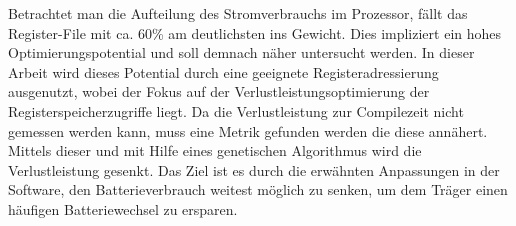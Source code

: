Betrachtet man die Aufteilung des Stromverbrauchs im Prozessor, fällt das Register-File mit ca. 60\% am deutlichsten ins Gewicht. Dies impliziert ein hohes Optimierungspotential und soll demnach näher untersucht werden. In dieser Arbeit wird dieses Potential durch eine geeignete Registeradressierung ausgenutzt, wobei der Fokus auf der Verlustleistungsoptimierung der Registerspeicherzugriffe liegt. Da die Verlustleistung zur Compilezeit nicht gemessen werden kann, muss eine Metrik gefunden werden die diese annähert. Mittels dieser und mit Hilfe eines genetischen Algorithmus wird die Verlustleistung gesenkt. Das Ziel ist es durch die erwähnten Anpassungen in der Software, den Batterieverbrauch weitest möglich zu senken, um dem Träger einen häufigen Batteriewechsel zu ersparen.






